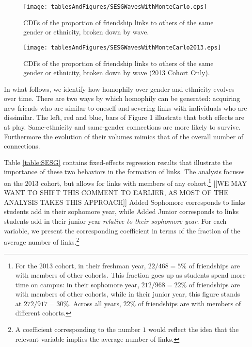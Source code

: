 \documentclass[12pt,letterpaper,english]{article}
\begin{document}
%

%

\begin{figure}[t!]
\begin{center}
\caption{CDFs of the proportion of friendship links to others of the same gender or ethnicity, broken down by wave. \label{MC_SG_SE_byWave}}
\texttt{[image: tablesAndFigures/SESGWavesWithMonteCarlo.eps]}
\end{center}
\end{figure}

\begin{figure}[t!]
\begin{center}
\caption{CDFs of the proportion of friendship links to others of the same gender or ethnicity, broken down by wave (2013 Cohort Only). \label{MC_SG_SE_byWave}}
\texttt{[image: tablesAndFigures/SESGWavesWithMonteCarlo2013.eps]}
\end{center}
\end{figure}


In what follows, we identify how homophily over gender and ethnicity evolves over time. There are two ways by which homophily can be generated: acquiring new friends who are similar to oneself and severing links with individuals who are dissimilar. The left, red and blue, bars of Figure 1 illustrate that both effects are at play. Same-ethnicity and same-gender connections are more likely to survive. Furthermore the evolution of their volumes mimics that of the overall number of connections.

Table \ref{table:SESG} contains fixed-effects regression results that illustrate the importance of these two behaviors in the formation of links. The analysis focuses on the 2013 cohort, but allows for links with members of any cohort.\footnote{For the 2013 cohort, in their freshman year, $22/468=5\%$ of friendships are with members of other cohorts. This fraction goes up as students spend more time on campus: in their sophomore year, $212/968=22\%$ of friendships are with members of other cohorts, while in their junior year, this figure stands at $272/917=30\%$. Across all years, $22\%$ of friendships are with members of different cohorts.} [[WE MAY WANT TO SHIFT THIS COMMENT TO EARLIER, AS MOST OF THE ANALYSIS TAKES THIS APPROACH]] Added Sophomore corresponds to links students add in their sophomore year, while Added Junior corresponds to links students add in their junior year \textit{relative to their sophomore year}. For each variable, we present the corresponding coefficient in terms of the fraction of the average number of links.\footnote{A coefficient corresponding to the number $1$ would reflect the idea that the relevant variable implies the average number of links.}  
\end{document}
